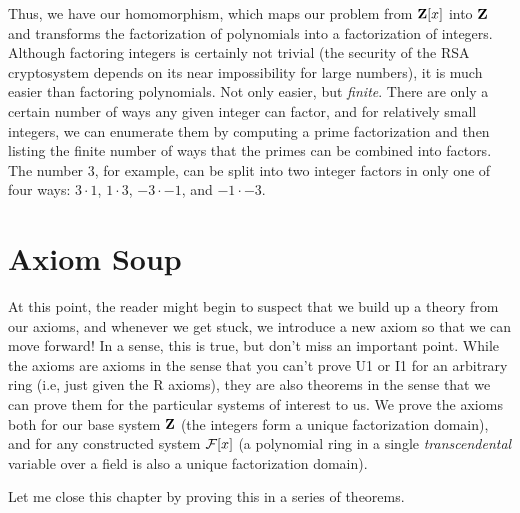 Thus, we have our homomorphism, which maps our problem from ${\bf
Z}[x]$ into ${\bf Z}$ and transforms the factorization of polynomials
into a factorization of integers.  Although factoring integers is
certainly not trivial (the security of the RSA cryptosystem depends on
its near impossibility for large numbers), it is much easier than
factoring polynomials.  Not only easier, but {\it finite}.  There are
only a certain number of ways any given integer can factor, and for
relatively small integers, we can enumerate them by computing a prime
factorization and then listing the finite number of ways that the
primes can be combined into factors.  The number $3$, for example, can
be split into two integer factors in only one of four ways: $3\cdot1$,
$1\cdot3$, $-3\cdot-1$, and $-1\cdot-3$.

\section{Axiom Soup}

At this point, the reader might begin to suspect that we build up a
theory from our axioms, and whenever we get stuck, we introduce a new
axiom so that we can move forward!  In a sense, this is true, but
don't miss an important point.  While the axioms are axioms in the
sense that you can't prove U1 or I1 for an arbitrary ring (i.e, just
given the R axioms), they are also theorems in the sense that we can
prove them for the particular systems of interest to us.  We prove the
axioms both for our base system ${\bf Z}$ (the integers form a unique
factorization domain), and for any constructed system ${\cal F}[x]$ (a
polynomial ring in a single {\it transcendental} variable over a field
is also a unique factorization domain).

Let me close this chapter by proving this in a series of theorems.
